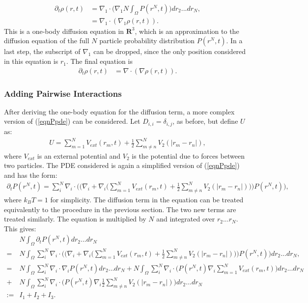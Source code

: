 \begin{align*} 
\partial_t \rho(r,t) &= \nabla_1 \cdot \bigg(\nabla_1 N \int_\Omega  P(r^N,t) \bigg)dr_2...dr_N,\\
&=  \nabla_1 \cdot(\nabla_1  \rho(r,t) ).
\end{align*}
This is a one-body diffusion equation in $\mathbf{R}^3$, which is an approximation to the diffusion equation of the full $N$ particle probability distribution $P(r^N,t)$. In a last step, the subscript of $\nabla_1$ can be dropped, since the only position considered in this equation is $r_1$. The final equation is
\begin{align} \label{eqnPMDiffTerm}
\partial_t \rho(r,t) &=  \nabla \cdot(\nabla \rho(r,t) ).
\end{align}


\subsubsection*{Adding Pairwise Interactions}
After deriving the one-body equation for the diffusion term, a more complex version of (\ref{eqnPpde}) can be considered. Let $D_{i,i}= \delta_{i,j}$, as before, but define $U$ as: 
\begin{align*}
U= \sum_{m=1}^N V_{ext}(r_m,t) + \frac{1}{2} \sum_{m \neq n}^N V_2(|r_m - r_n|),
\end{align*}
where $V_{ext}$ is an external potential and $V_2$ is the potential due to forces between two particles.
The PDE considered is again a simplified version of (\ref{eqnPpde}) and has the form:
\begin{align} \label{eqnPpde2}
 \partial_t P(r^N,t)= \sum_{i}^N \nabla_i \cdot \bigg(\bigg( \nabla_i + \nabla_i \bigg( \sum_{m=1}^N V_{ext}(r_m,t) + \frac{1}{2} \sum_{m \neq n}^N V_2(|r_m - r_n|)\bigg)  \bigg) P(r^N,t) \bigg),
 \end{align}
where $k_B T=1$ for simplicity.
The diffusion term in the equation can be treated equivalently to the procedure in the previous section.
The two new terms are treated similarly. The equation is multiplied by $N$ and integrated over $r_2...r_N$.
This gives:
\begin{align*} 
&N\int_\Omega \partial_t P(r^N,t) dr_2...dr_N\\
=& N\int_\Omega \sum_{i}^N \nabla_i \cdot \bigg(\bigg( \nabla_i + \nabla_i \bigg( \sum_{m=1}^N V_{ext}(r_m,t) + \frac{1}{2} \sum_{m \neq n}^N V_2(|r_m - r_n|)\bigg)  \bigg) P(r^N,t) \bigg) dr_2...dr_N,\\
=& N\int_\Omega \sum_{i}^N \nabla_i \cdot \nabla_i P(r^N,t)dr_2...dr_N + N\int_\Omega \sum_{i}^N \nabla_i \cdot \bigg( P(r^N,t) \nabla_i \sum_{m=1}^N V_{ext}(r_m,t) \bigg) dr_2...dr_N\\ +& N\int_\Omega \sum_{i}^N \nabla_i \cdot \bigg( P(r^N,t)\nabla_i \frac{1}{2} \sum_{m \neq n}^N V_2(|r_m - r_n|) \bigg) dr_2...dr_N\\
:=& I_1 + I_2 +I_3.
\end{align*}
